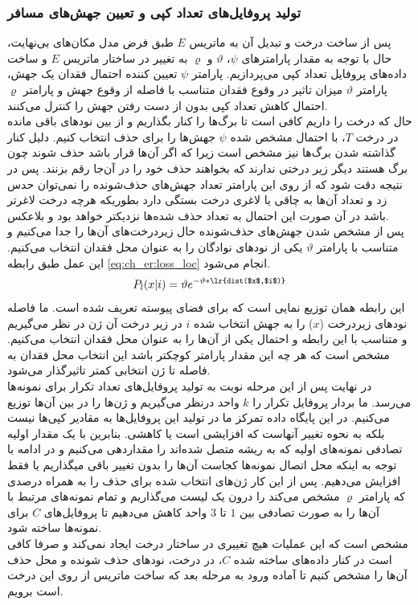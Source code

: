 \subsubsection{تولید پروفایل‌های تعداد کپی و تعیین جهش‌های مسافر}
پس از ساخت درخت و تبدیل آن به ماتریس $E$ طبق فرض مدل مکان‌های بی‌نهایت، حال با توجه به مقدار پارامترهای $\psi$، $\vartheta$ و $\varrho$ به تغییر در ساختار ماتریس $E$ و ساخت داده‌های پروفایل تعداد کپی می‌پردازیم.
پارامتر $\psi$ تعیین ‌کننده احتمال فقدان یک جهش، پارامتر $\vartheta$ میزان تاثیر در وقوع فقدان متناسب با فاصله از وقوع جهش و پارامتر $\varrho$ احتمال کاهش تعداد کپی بدون از دست رفتن جهش را کنترل می‌کنند.
\\
حال که درخت را داریم کافی است تا برگ‌ها را کنار بگذاریم و از بین نود‌های باقی مانده در درخت $T$، با احتمال مشخص شده $\psi$ جهش‌ها را برای حذف انتخاب ‌کنیم. دلیل کنار گذاشته شدن برگ‌ها نیز مشخص است زیرا که اگر آن‌ها قرار باشد حذف شوند چون برگ هستند دیگر زیر درختی ندارند که بخواهند حذف خود را در آن‌جا رقم بزنند. پس در نتیجه دقت شود که از روی این پارامتر تعداد جهش‌های حذف‌شونده را نمی‌توان حدس زد و تعداد آن‌ها به چاقی یا لاغری درخت بستگی دارد بطوریکه هرچه درخت لاغرتر باشد در آن صورت این احتمال به تعداد حذف شده‌ها نزدیکتر خواهد بود و بلاعکس.\\
پس از مشخص شدن جهش‌های حذف‌شونده حال زیردرخت‌های آن‌ها را جدا می‌کنیم و متناسب با پارامتر $\vartheta$ یکی از نودهای نوادگان را به عنوان محل فقدان انتخاب می‌کنیم. این عمل طبق رابطه \ref{eq:ch_er:loss_loc} انجام می‌شود.
\begin{equation}
	P_l(x|i) = \vartheta e^{-\vartheta *\text{\lr{dist($x$,$i$)}}}
	\label{eq:ch_er:loss_loc}
\end{equation}
این رابطه همان توزیع نمایی است که برای فضای پیوسته تعریف شده است. ما فاصله نودهای زیردرخت ($x$) را به جهش انتخاب شده $i$ در زیر درخت آن ژن در نظر می‌گیریم و متناسب با این رابطه و احتمال یکی از آن‌ها را به عنوان محل فقدان انتخاب می‌کنیم. مشخص است که هر چه این مقدار پارامتر کوچکتر باشد این انتخاب محل فقدان به فاصله تا ژن انتخابی کمتر تاثیرگذار می‌شود.
\\
در نهایت پس از این مرحله نوبت به تولید پروفایل‌های تعداد تکرار برای نمونه‌ها می‌رسد. ما بردار پروفایل تکرار را $k$ واحد درنظر می‌گیریم و ژن‌ها را در بین آن‌ها توزیع می‌کنیم. در این پایگاه داده تمرکز ما در تولید این پروفایل‌ها به مقادیر کپی‌ها نیست بلکه به نحوه تغییر آنهاست که افزایشی است یا کاهشی. بنابرین با یک مقدار اولیه تصادفی نمونه‌های اولیه که به ریشه متصل شده‌اند را مقداردهی می‌کنیم و در ادامه با توجه به اینکه محل اتصال نمونه‌ها کجاست آن‌ها را بدون تغییر باقی میگذاریم یا فقط افزایش می‌دهیم. پس از این کار ژن‌های انتخاب شده برای حذف را به همراه درصدی که پارامتر $\varrho$ مشخص می‌کند را درون یک لیست می‌گذاریم و تمام نمونه‌های مرتبط با آن‌ها را به صورت تصادفی بین $1$ تا $3$ واحد کاهش می‌دهیم تا پروفایل‌های $C$ برای نمونه‌ها ساخته شود.\\
مشخص است که این عملیات هیچ تغییری در ساختار درخت ایجاد نمی‌کند و صرفا کافی است در کنار داده‌های ساخته شده ‌$C$، در درخت، نودهای حذف شونده و محل حذف آن‌ها را مشخص کنیم تا آماده ورود به مرحله بعد که ساخت ماتریس از روی این درخت است برویم.


